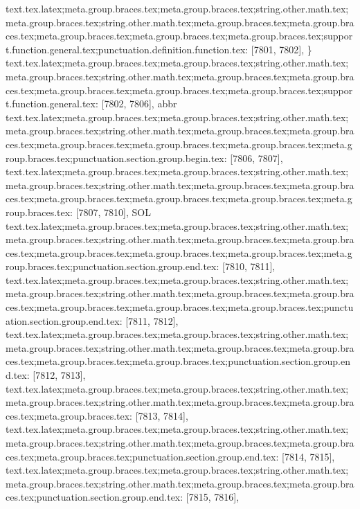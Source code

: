 {{{{{{{{{{{{{{{{{{{{{{{{{{{{{{{{{{{{{{{{{{{{{{{{{{{{{{{{{{{{{{{{{{{{{{{{{{{{{{{{{{{{{{{{{{{{{{{{{{{{{{{{{{{{{{{{{{{{{{{{{{{{{{{{{{{{{{{{{{{{{{{{{{{{{{{{{{{{{{{{{{{{{{{{{{{{{{{{{{{{{{{{{{{{{{{{{{{{{{{{{{{{{{{{{{{{{{{{{{{{{{{{{{{{{{{{{text.tex.latex;meta.group.braces.tex;meta.group.braces.tex;string.other.math.tex;meta.group.braces.tex;string.other.math.tex;meta.group.braces.tex;meta.group.braces.tex;meta.group.braces.tex;meta.group.braces.tex;meta.group.braces.tex;support.function.general.tex;punctuation.definition.function.tex: [7801, 7802], {\}
text.tex.latex;meta.group.braces.tex;meta.group.braces.tex;string.other.math.tex;meta.group.braces.tex;string.other.math.tex;meta.group.braces.tex;meta.group.braces.tex;meta.group.braces.tex;meta.group.braces.tex;meta.group.braces.tex;support.function.general.tex: [7802, 7806], {abbr}
text.tex.latex;meta.group.braces.tex;meta.group.braces.tex;string.other.math.tex;meta.group.braces.tex;string.other.math.tex;meta.group.braces.tex;meta.group.braces.tex;meta.group.braces.tex;meta.group.braces.tex;meta.group.braces.tex;meta.group.braces.tex;punctuation.section.group.begin.tex: [7806, 7807], {{}
text.tex.latex;meta.group.braces.tex;meta.group.braces.tex;string.other.math.tex;meta.group.braces.tex;string.other.math.tex;meta.group.braces.tex;meta.group.braces.tex;meta.group.braces.tex;meta.group.braces.tex;meta.group.braces.tex;meta.group.braces.tex: [7807, 7810], {SOL}
text.tex.latex;meta.group.braces.tex;meta.group.braces.tex;string.other.math.tex;meta.group.braces.tex;string.other.math.tex;meta.group.braces.tex;meta.group.braces.tex;meta.group.braces.tex;meta.group.braces.tex;meta.group.braces.tex;meta.group.braces.tex;punctuation.section.group.end.tex: [7810, 7811], {}}
text.tex.latex;meta.group.braces.tex;meta.group.braces.tex;string.other.math.tex;meta.group.braces.tex;string.other.math.tex;meta.group.braces.tex;meta.group.braces.tex;meta.group.braces.tex;meta.group.braces.tex;meta.group.braces.tex;punctuation.section.group.end.tex: [7811, 7812], {}}
text.tex.latex;meta.group.braces.tex;meta.group.braces.tex;string.other.math.tex;meta.group.braces.tex;string.other.math.tex;meta.group.braces.tex;meta.group.braces.tex;meta.group.braces.tex;meta.group.braces.tex;punctuation.section.group.end.tex: [7812, 7813], {}}
text.tex.latex;meta.group.braces.tex;meta.group.braces.tex;string.other.math.tex;meta.group.braces.tex;string.other.math.tex;meta.group.braces.tex;meta.group.braces.tex;meta.group.braces.tex: [7813, 7814], { }
text.tex.latex;meta.group.braces.tex;meta.group.braces.tex;string.other.math.tex;meta.group.braces.tex;string.other.math.tex;meta.group.braces.tex;meta.group.braces.tex;meta.group.braces.tex;punctuation.section.group.end.tex: [7814, 7815], {}}
text.tex.latex;meta.group.braces.tex;meta.group.braces.tex;string.other.math.tex;meta.group.braces.tex;string.other.math.tex;meta.group.braces.tex;meta.group.braces.tex;punctuation.section.group.end.tex: [7815, 7816], {}}
}}}}}}}}}}}}}}}}}}}}}}}}}}}}}}}}}}}}}}}}}}}}}}}}}}}}}}}}}}}}}}}}}}}}}}}}}}}}}}}}}}}}}}}}}}}}}}}}}}}}}}}}}}}}}}}}}}}}}}}}}}}}}}}}}}}}}}}}}}}}}}}}}}}}}}}}}}}}}}}}}}}}}}}}}}}}}}}}}}}}}}}}}}}}}}}}}}}}}}}}}}}}}}}}}}}}}}}}}}}}}}}}}}}}}}
